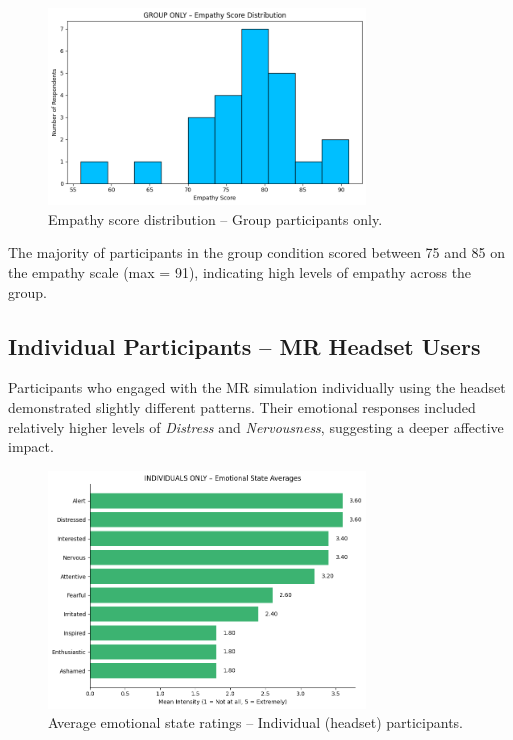 \begin{figure}[H]
    \centering
    \includegraphics[width=0.75\textwidth]{../../Figures/empathy-score-post-grp.png}
    \caption{Empathy score distribution – Group participants only.}
    \label{fig:empathy_group_post}
\end{figure}

The majority of participants in the group condition scored between 75 and 85 on the empathy scale (max = 91), indicating high levels of empathy across the group.

\subsection{Individual Participants – MR Headset Users}

Participants who engaged with the MR simulation individually using the headset demonstrated slightly different patterns. Their emotional responses included relatively higher levels of \textit{Distress} and \textit{Nervousness}, suggesting a deeper affective impact.

\begin{figure}[H]
    \centering
    \includegraphics[width=0.75\textwidth]{../../Figures/emotional-post-indiv.png}
    \caption{Average emotional state ratings – Individual (headset) participants.}
    \label{fig:emotional_post_indiv}
\end{figure}

